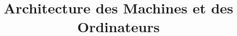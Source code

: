 \title{Architecture des Machines et des Ordinateurs} %

\newcommand{\name}{Maguendra Codandamourty} %
\newcommand{\studentid}{825041861} %
\newcommand{\subtitle}{Chapitre 1 --- Généralités sur les ordinateurs} %
\newcommand{\teacher}{Philippe Kislin-Duval}


